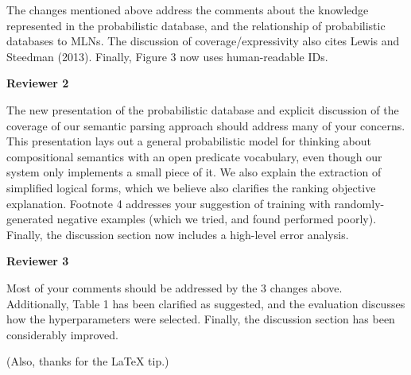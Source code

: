 \documentclass[10pt]{article}
\begin{document}
The changes mentioned above address the comments about the knowledge
represented in the probabilistic database, and the relationship of
probabilistic databases to MLNs. The discussion of
coverage/expressivity also cites Lewis and Steedman (2013). Finally,
Figure 3 now uses human-readable IDs.


{\bf Reviewer 2}

The new presentation of the probabilistic database and explicit
discussion of the coverage of our semantic parsing approach should
address many of your concerns. This presentation lays out a general
probabilistic model for thinking about compositional semantics with an
open predicate vocabulary, even though our system only implements a
small piece of it. We also explain the extraction of simplified
logical forms, which we believe also clarifies the ranking objective
explanation. Footnote 4 addresses your suggestion of training with
randomly-generated negative examples (which we tried, and found
performed poorly). Finally, the discussion section now includes a
high-level error analysis.


{\bf Reviewer 3}

Most of your comments should be addressed by the 3 changes
above. Additionally, Table 1 has been clarified as suggested, and the
evaluation discusses how the hyperparameters were selected. Finally,
the discussion section has been considerably improved.

(Also, thanks for the LaTeX tip.)
\end{document}
